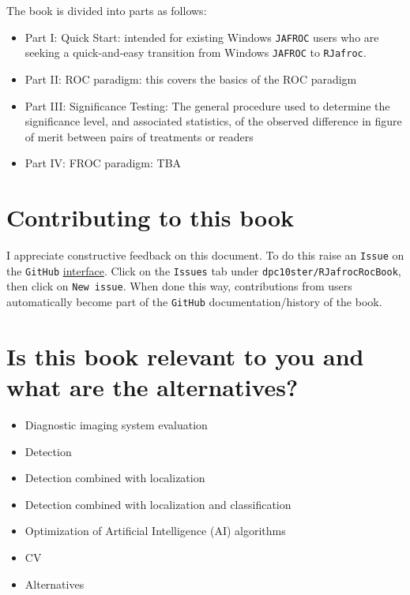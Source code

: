 \documentclass[
]{book}
\providecommand{\tightlist}{%
  \setlength{\itemsep}{0pt}\setlength{\parskip}{0pt}}
\begin{document}
The book is divided into parts as follows:

\begin{itemize}
\tightlist
\item
  Part I: Quick Start: intended for existing Windows \texttt{JAFROC} users who are seeking a quick-and-easy transition from Windows \texttt{JAFROC} to \texttt{RJafroc}.
\item
  Part II: ROC paradigm: this covers the basics of the ROC paradigm
\item
  Part III: Significance Testing: The general procedure used to determine the significance level, and associated statistics, of the observed difference in figure of merit between pairs of treatments or readers
\item
  Part IV: FROC paradigm: TBA
\end{itemize}

\hypertarget{contributing-to-this-book}{%
\section*{Contributing to this book}\label{contributing-to-this-book}}

I appreciate constructive feedback on this document. To do this raise an \texttt{Issue} on the \texttt{GitHub} \href{https://github.com/dpc10ster/RJafrocRocBook}{interface}. Click on the \texttt{Issues} tab under \texttt{dpc10ster/RJafrocRocBook}, then click on \texttt{New\ issue}. When done this way, contributions from users automatically become part of the \texttt{GitHub} documentation/history of the book.

\hypertarget{is-this-book-relevant-to-you-and-what-are-the-alternatives}{%
\section*{Is this book relevant to you and what are the alternatives?}\label{is-this-book-relevant-to-you-and-what-are-the-alternatives}}

\begin{itemize}
\tightlist
\item
  Diagnostic imaging system evaluation
\item
  Detection
\item
  Detection combined with localization
\item
  Detection combined with localization and classification
\item
  Optimization of Artificial Intelligence (AI) algorithms
\item
  CV
\item
  Alternatives
\end{itemize}
\end{document}
